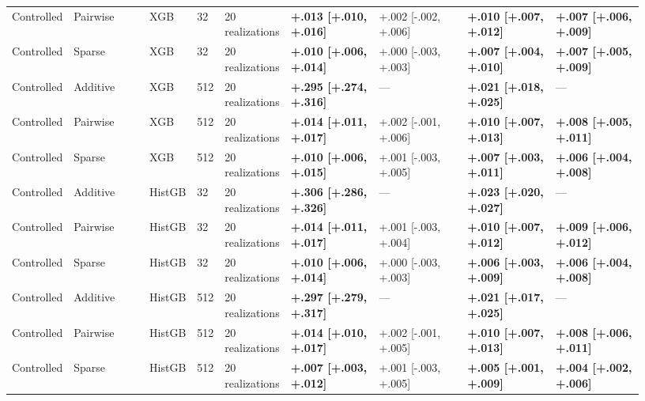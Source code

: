 \begin{longtable}{P{0.07\linewidth}P{0.12\linewidth}P{0.06\linewidth}P{0.04\linewidth}P{0.08\linewidth}P{0.14\linewidth}P{0.14\linewidth}P{0.14\linewidth}P{0.14\linewidth}}
Controlled & Pairwise & XGB & 32 & 20 realizations & \textbf{+.013 [+.010, +.016]} & +.002 [-.002, +.006] & \textbf{+.010 [+.007, +.012]} & \textbf{+.007 [+.006, +.009]} \\
Controlled & Sparse & XGB & 32 & 20 realizations & \textbf{+.010 [+.006, +.014]} & +.000 [-.003, +.003] & \textbf{+.007 [+.004, +.010]} & \textbf{+.007 [+.005, +.009]} \\
Controlled & Additive & XGB & 512 & 20 realizations & \textbf{+.295 [+.274, +.316]} & --- & \textbf{+.021 [+.018, +.025]} & --- \\
Controlled & Pairwise & XGB & 512 & 20 realizations & \textbf{+.014 [+.011, +.017]} & +.002 [-.001, +.006] & \textbf{+.010 [+.007, +.013]} & \textbf{+.008 [+.005, +.011]} \\
Controlled & Sparse & XGB & 512 & 20 realizations & \textbf{+.010 [+.006, +.015]} & +.001 [-.003, +.005] & \textbf{+.007 [+.003, +.011]} & \textbf{+.006 [+.004, +.008]} \\
Controlled & Additive & HistGB & 32 & 20 realizations & \textbf{+.306 [+.286, +.326]} & --- & \textbf{+.023 [+.020, +.027]} & --- \\
Controlled & Pairwise & HistGB & 32 & 20 realizations & \textbf{+.014 [+.011, +.017]} & +.001 [-.003, +.004] & \textbf{+.010 [+.007, +.012]} & \textbf{+.009 [+.006, +.012]} \\
Controlled & Sparse & HistGB & 32 & 20 realizations & \textbf{+.010 [+.006, +.014]} & +.000 [-.003, +.003] & \textbf{+.006 [+.003, +.009]} & \textbf{+.006 [+.004, +.008]} \\
Controlled & Additive & HistGB & 512 & 20 realizations & \textbf{+.297 [+.279, +.317]} & --- & \textbf{+.021 [+.017, +.025]} & --- \\
Controlled & Pairwise & HistGB & 512 & 20 realizations & \textbf{+.014 [+.010, +.017]} & +.002 [-.001, +.005] & \textbf{+.010 [+.007, +.013]} & \textbf{+.008 [+.006, +.011]} \\
Controlled & Sparse & HistGB & 512 & 20 realizations & \textbf{+.007 [+.003, +.012]} & +.001 [-.003, +.005] & \textbf{+.005 [+.001, +.009]} & \textbf{+.004 [+.002, +.006]} \\
\end{longtable}
